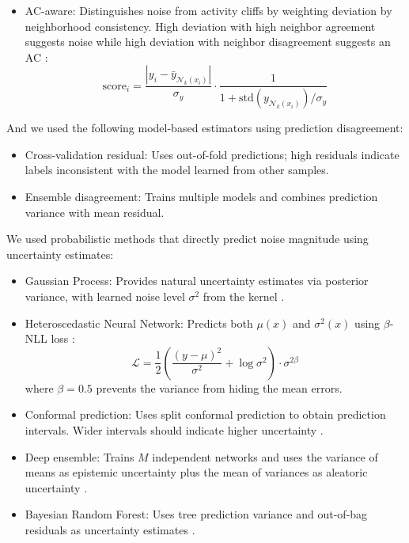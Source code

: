 {\begin{itemize}
    \item AC-aware: Distinguishes noise from activity cliffs by weighting deviation by neighborhood consistency. High deviation with high neighbor agreement suggests noise while high deviation with neighbor disagreement suggests an AC \citep{Dablander2023}:
    $$\text{score}_i = \frac{|y_i - \bar{y}_{\mathcal{N}_k(x_i)}|}{\sigma_y} \cdot \frac{1}{1 + \text{std}(y_{\mathcal{N}_k(x_i)})/\sigma_y}$$
\end{itemize}

And we used the following model-based estimators using prediction disagreement:

\begin{itemize}
    \item Cross-validation residual: Uses out-of-fold predictions; high residuals indicate labels inconsistent with the model learned from other samples.
    \item Ensemble disagreement: Trains multiple models and combines prediction variance with mean residual.
\end{itemize}

We used probabilistic methods that directly predict noise magnitude using uncertainty estimates:

\begin{itemize}
    \item Gaussian Process: Provides natural uncertainty estimates via posterior variance, with learned noise level $\sigma^2$ from the kernel \citep{gauche}.
    
    \item Heteroscedastic Neural Network: Predicts both $\mu(x)$ and $\sigma^2(x)$ using $\beta$-NLL loss \citep{Seitzer2022}:
    $$\mathcal{L} = \frac{1}{2}\left(\frac{(y - \mu)^2}{\sigma^2} + \log \sigma^2\right) \cdot \sigma^{2\beta}$$
    where $\beta = 0.5$ prevents the variance from hiding the mean errors.
    
    \item Conformal prediction: Uses split conformal prediction to obtain prediction intervals. Wider intervals should indicate higher uncertainty \citep{Shafer2008}.
    
    \item Deep ensemble: Trains $M$ independent networks and uses the variance of means as epistemic uncertainty plus the mean of variances as aleatoric uncertainty \citep{lakshminarayanan2017}.
    
    \item Bayesian Random Forest: Uses tree prediction variance and out-of-bag residuals as uncertainty estimates \citep{taddy2015}.
    

\end{itemize}}
